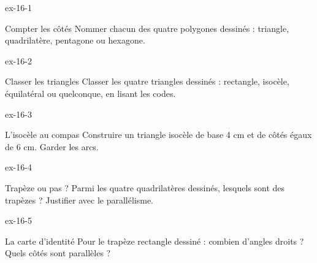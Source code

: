 \clearpage{}
\begin{blocLivre}{ex-16-1}\begin{exercice}[1]{Compter les côtés}
Nommer chacun des quatre polygones dessinés : triangle, quadrilatère, pentagone ou hexagone.
\label{fig-ex-16-1}
\end{exercice}\end{blocLivre}
\begin{blocLivre}{ex-16-2}\begin{exercice}[1]{Classer les triangles}
Classer les quatre triangles dessinés : rectangle, isocèle, équilatéral ou quelconque, en lisant les codes.
\label{fig-ex-16-2}
\end{exercice}\end{blocLivre}
\begin{blocLivre}{ex-16-3}\begin{exercice}[1]{L’isocèle au compas}
Construire un triangle isocèle de base 4 cm et de côtés égaux de 6 cm. Garder les arcs.
\label{fig-ex-16-3}
\end{exercice}\end{blocLivre}
\begin{blocLivre}{ex-16-4}\begin{exercice}[1]{Trapèze ou pas ?}
Parmi les quatre quadrilatères dessinés, lesquels sont des trapèzes ? Justifier avec le parallélisme.
\label{fig-ex-16-4}
\end{exercice}\end{blocLivre}
\begin{blocLivre}{ex-16-5}\begin{exercice}[1]{La carte d’identité}
Pour le trapèze rectangle dessiné : combien d’angles droits ? Quels côtés sont parallèles ?
\label{fig-ex-16-5}
\end{exercice}\end{blocLivre}

